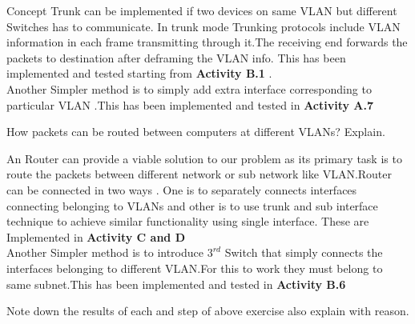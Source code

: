 \documentclass[a4paper,11pt]{article}
\begin{document}
\begin{A}
    {
        Concept Trunk can be implemented if two devices on same VLAN but different Switches has to communicate. In trunk mode Trunking protocols include VLAN information in each frame transmitting through it.The receiving end forwards the packets to destination after deframing the VLAN info. This has been implemented and tested starting from \textbf{Activity B.1} .\\

        Another Simpler method is to simply add extra interface corresponding to particular VLAN .This has been implemented and tested in \textbf{Activity A.7}
    }
\end{A}

\begin{Q}
    {
        How packets can be routed between computers at different VLANs? Explain.
    }
\end{Q}

\begin{A}
    {
        An Router can provide a viable solution to our problem as its primary task is to route the packets between different network or sub network like VLAN.Router can be connected in two ways . One is to separately connects interfaces connecting belonging to VLANs and other is to use trunk and sub interface technique to achieve similar functionality using single interface. These are Implemented in \textbf{Activity C and D}\\

        Another Simpler method is to introduce $3^{rd}$ Switch that simply connects the interfaces belonging to different VLAN.For this to work they must belong to same subnet.This has been implemented and tested in \textbf{Activity B.6}
    }
\end{A}

\begin{Q}
    {
        Note down the results of each and step of above exercise also explain with reason.
    }
\end{Q}

%
%
%
%

%
%
\end{document}
